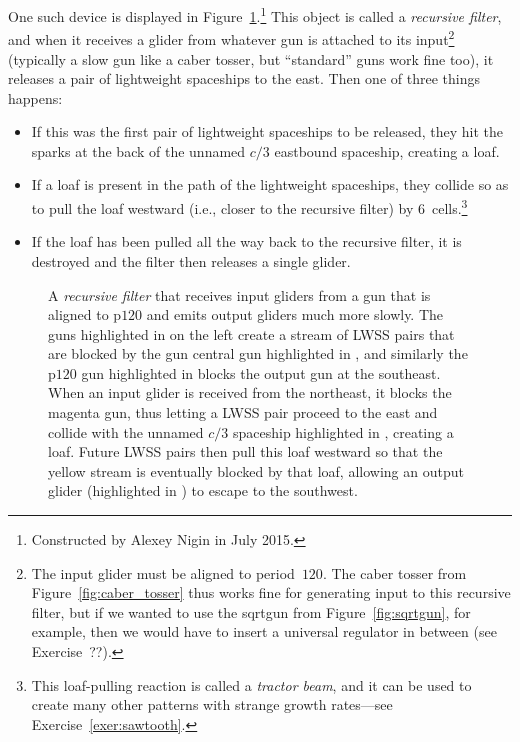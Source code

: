 One such device is displayed in Figure~\ref{fig:recursive_filter}.\footnote{Constructed by Alexey Nigin in July 2015.} This object is called a \emph{recursive filter}, and when it receives a glider from whatever gun is attached to its input\footnote{The input glider must be aligned to period~$120$. The caber tosser from Figure~\ref{fig:caber_tosser} thus works fine for generating input to this recursive filter, but if we wanted to use the sqrtgun from Figure~\ref{fig:sqrtgun}, for example, then we would have to insert a universal regulator in between (see Exercise~??).} (typically a slow gun like a caber tosser, but ``standard'' guns work fine too), it releases a pair of lightweight spaceships to the east. Then one of three things happens:\smallskip

\begin{itemize}
	\item[1)] If this was the first pair of lightweight spaceships to be released, they hit the sparks at the back of the unnamed $c/3$ eastbound spaceship, creating a loaf.\smallskip
	
	\item[2)] If a loaf is present in the path of the lightweight spaceships, they collide so as to pull the loaf westward (i.e., closer to the recursive filter) by $6$~cells.\footnote{This loaf-pulling reaction is called a \emph{tractor beam}, and it can be used to create many other patterns with strange growth rates---see Exercise~\ref{exer:sawtooth}.}\smallskip
	
	\item[3)] If the loaf has been pulled all the way back to the recursive filter, it is destroyed and the filter then releases a single glider.\smallskip
\end{itemize}

\begin{figure}[!htb]
	\centering
	\caption{A \emph{recursive filter} that receives input gliders from a gun that is aligned to p$120$ and emits output gliders much more slowly. The guns highlighted in  on the left create a stream of LWSS pairs that are blocked by the gun central gun highlighted in , and similarly the p$120$ gun highlighted in  blocks the output gun at the southeast. When an input glider is received from the northeast, it blocks the magenta gun, thus letting a LWSS pair proceed to the east and collide with the unnamed $c/3$ spaceship highlighted in , creating a loaf. Future LWSS pairs then pull this loaf westward so that the yellow stream is eventually blocked by that loaf, allowing an output glider (highlighted in ) to escape to the southwest.}\label{fig:recursive_filter}
\end{figure}

